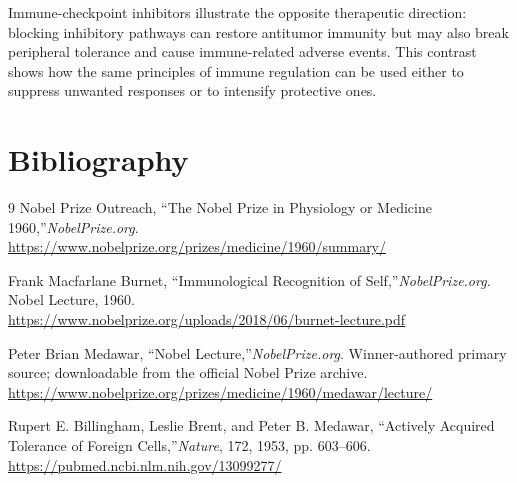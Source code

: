 Immune-checkpoint inhibitors illustrate the opposite therapeutic direction: blocking inhibitory pathways can restore antitumor immunity but may also break peripheral tolerance and cause immune-related adverse events. This contrast shows how the same principles of immune regulation can be used either to suppress unwanted responses or to intensify protective ones.

\section{Bibliography}

\begin{thebibliography}{9}
Nobel Prize Outreach, ``The Nobel Prize in Physiology or Medicine 1960,''\emph{NobelPrize.org}.\\
\url{https://www.nobelprize.org/prizes/medicine/1960/summary/}

Frank Macfarlane Burnet, ``Immunological Recognition of Self,''\emph{NobelPrize.org}. Nobel Lecture, 1960.\\
\url{https://www.nobelprize.org/uploads/2018/06/burnet-lecture.pdf}

Peter Brian Medawar, ``Nobel Lecture,''\emph{NobelPrize.org}. Winner-authored primary source; downloadable from the official Nobel Prize archive.\\
\url{https://www.nobelprize.org/prizes/medicine/1960/medawar/lecture/}

Rupert E. Billingham, Leslie Brent, and Peter B. Medawar, ``Actively Acquired Tolerance of Foreign Cells,''\emph{Nature}, 172, 1953, pp. 603--606.\\
\url{https://pubmed.ncbi.nlm.nih.gov/13099277/}
\end{thebibliography}
